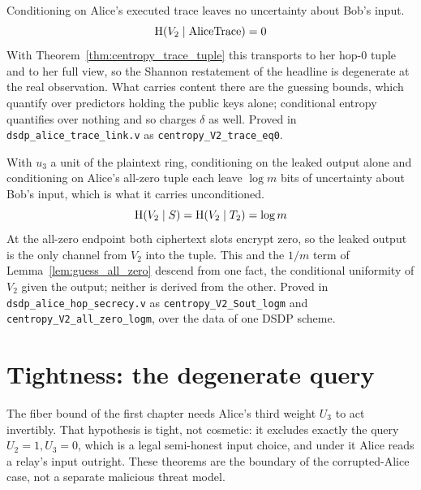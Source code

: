 \begin{theorem}
  \label{thm:centropy_trace_eq0}
  \rocqok
  Conditioning on Alice's executed trace leaves no uncertainty about Bob's
  input.
  \[ \mathrm{H}(V_2 \mid \mathrm{AliceTrace}) = 0 \]
  With Theorem~\ref{thm:centropy_trace_tuple} this transports to her hop-$0$
  tuple and to her full view, so the Shannon restatement of the headline is
  degenerate at the real observation. What carries content there are the
  guessing bounds, which quantify over predictors holding the public keys
  alone; conditional entropy quantifies over nothing and so charges $\delta$ as
  well.
  Proved in \texttt{dsdp\_alice\_trace\_link.v} as
  \texttt{centropy\_V2\_trace\_eq0}.
\end{theorem}

\begin{theorem}
  \label{thm:centropy_endpoints}
  \rocqok
  With $u_3$ a unit of the plaintext ring, conditioning on the leaked output
  alone and conditioning on Alice's all-zero tuple each leave $\log m$ bits of
  uncertainty about Bob's input, which is what it carries unconditioned.
  \[ \mathrm{H}(V_2 \mid S) = \mathrm{H}(V_2 \mid T_{2}) = \log m \]
  At the all-zero endpoint both ciphertext slots encrypt zero, so the leaked
  output is the only channel from $V_2$ into the tuple. This and the $1/m$ term
  of Lemma~\ref{lem:guess_all_zero} descend from one fact, the conditional
  uniformity of $V_2$ given the output; neither is derived from the other.
  Proved in \texttt{dsdp\_alice\_hop\_secrecy.v} as
  \texttt{centropy\_V2\_Sout\_logm} and
  \texttt{centropy\_V2\_all\_zero\_logm}, over the data of one DSDP scheme.
\end{theorem}

\chapter{Tightness: the degenerate query}

The fiber bound of the first chapter needs Alice's third weight $U_3$ to act
invertibly. That hypothesis is tight, not cosmetic: it excludes exactly the query
$U_2 = 1, U_3 = 0$, which is a legal semi-honest input choice, and under it Alice
reads a relay's input outright. These theorems are the boundary of the
corrupted-Alice case, not a separate malicious threat model.

